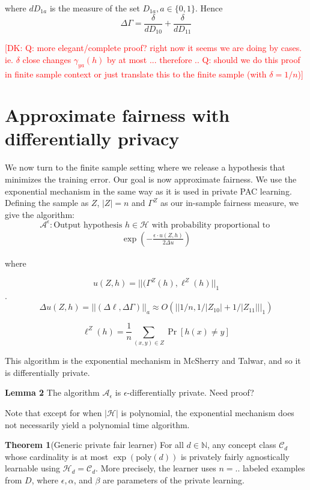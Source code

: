 \documentclass[runningheads]{article}
\newcommand{\dk}[1]{\textcolor{red}{[DK: #1]}}
\newcommand{\A}{\mathcal{A}}
\renewcommand{\H}{\mathcal{H}}
\newcommand{\C}{\mathcal{C}}
\newcommand{\1}{\mathbbm{1}}
\theoremstyle{definition}
\begin{document}
where $dD_{1a}$ is the measure of the set $D_{1a}, a \in \{0,1\}$. Hence
$$\Delta\Gamma = \frac{\delta}{dD_{10}} + \frac{\delta}{dD_{11}}$$

\dk{Q: more elegant/complete proof? right now it seems we are doing by cases. ie. $\delta$ close changes $\gamma_{ya}(h)$ by at most ... therefore ..
Q: should we do this proof in finite sample context or just translate this to the finite sample (with $\delta = 1/n$)}

\section{Approximate fairness with differentially privacy}



We now turn to the finite sample setting where we release a hypothesis that minimizes the training error. Our goal is now approximate fairness. We use the exponential mechanism in the same way as it is used in private PAC learning. Defining the sample as $Z$, $|Z| = n$ and $\Gamma^{Z}$ as our in-sample fairness measure, we give the algorithm:
$$\mathcal{A}^\epsilon : \text{Output hypothesis }h \in \mathcal{H} \text{ with probability proportional to }$$
\begin{align}
\exp(-\frac{\epsilon \cdot u(Z,h)}{2\Delta u})
\end{align}

where

$$u(Z,h) = ||(\Gamma^Z(h), \ell^Z(h)||_{1}$$.
$$\Delta u(Z,h) = ||(\Delta\ell,\Delta{\Gamma})||_a \approx O(||1/n,1/|Z_{10}|+1/|Z_{11}|||_1)$$

$$\ell^Z(h) = \frac{1}{n} \sum_{(x,y) \in Z}\Pr[h(x) \neq y]$$



This algorithm is the exponential mechanism in McSherry and Talwar, and so it is differentially private. 

{\bf Lemma 2} The algorithm $\A_\epsilon$ is $\epsilon$-differentially private.
Need proof? 

Note that except for when $|\H|$ is polynomial, the exponential mechanism does not necessarily yield a polynomial time algorithm.

{\bf Theorem 1}(Generic private fair learner) For all $d \in \mathbb{N}$, any concept class $\mathcal{C}_d$ whose cardinality is at most $\exp(\text{poly}(d))$ is privately fairly agnostically learnable using $\H_d = \C_d$. More precisely, the learner uses $n = ..$ labeled examples from $D$, where $\epsilon, \alpha$, and $\beta$ are parameters of the private learning.
\end{document}
